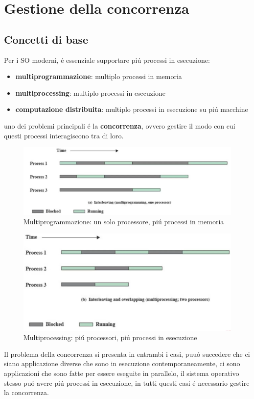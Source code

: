 \section{Gestione della concorrenza}

\subsection{Concetti di base}
Per i SO moderni, é essenziale supportare piú processi in esecuzione:
\begin{itemize}
    \item \textbf{multiprogrammazione}: multiplo processi in memoria
    \item \textbf{multiprocessing}: multiplo processi in esecuzione
    \item \textbf{computazione distribuita}: multiplo processi in esecuzione su piú macchine
\end{itemize}
uno dei problemi principali é la \textbf{concorrenza}, ovvero gestire il modo con cui questi processi interagiscono tra di loro.
\begin{figure}
    \centering
    \includegraphics[width=0.5\linewidth]{immagini/multiprogrammazzione}
    \caption{Multiprogrammazione: un solo processore, piú processi in memoria}
\end{figure}
\begin{figure}
    \centering
    \includegraphics[width=0.5\linewidth]{immagini/MultiProcessing}
    \caption{Multiprocessing: piú processori, piú processi in esecuzione}
\end{figure}
Il problema della concorrenza si presenta in entrambi i casi, puuó succedere che ci siano applicazione diverse che sono in
esecuzione contemporaneamente, ci sono applicazioni che sono fatte per essere eseguite in parallelo, il sistema operativo stesso
puó avere piú processi in esecuzione, in tutti questi casi é necessario gestire la concorrenza.
